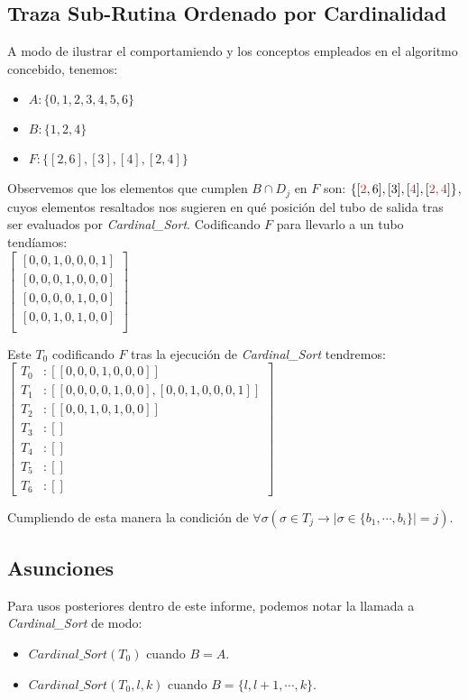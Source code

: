 \documentclass[12pt, letterpaper, twoside]{article}
\begin{document}
    \subsection{Traza Sub-Rutina Ordenado por Cardinalidad}
    \par A modo de ilustrar el comportamiendo y los conceptos empleados en el algoritmo concebido, tenemos:
    \begin{itemize}
        \item $A: \{0, 1, 2, 3, 4, 5, 6\}$
        \item $B: \{1, 2, 4\}$
        \item $F: \{[2, 6], [3], [4], [2, 4]\}$
    \end{itemize}
    \par Observemos que los elementos que cumplen $B\cap D_j$ en $F$ son: $\{[\textcolor{red}{2}, 6], [3], [\textcolor{red}{4}], [\textcolor{red}{2, 4}]\}$, cuyos elementos resaltados nos sugieren en qué posición del tubo de salida tras ser evaluados por \emph{Cardinal\_Sort}. Codificando $F$ para llevarlo a un tubo tendíamos: \\
    $
        \begin{bmatrix}
            [0, 0, 1, 0, 0, 0, 1] \\
            [0, 0, 0, 1, 0, 0, 0] \\
            [0, 0, 0, 0, 1, 0, 0] \\
            [0, 0, 1, 0, 1, 0, 0] \\
        \end{bmatrix}
    $
    \par Este $T_0$ codificando $F$ tras la ejecución de \emph{Cardinal\_Sort} tendremos: \\
    $
    \begin{bmatrix}
            T_0&: [[0, 0, 0, 1, 0, 0, 0]] \\
            T_1&: [[0, 0, 0, 0, 1, 0, 0], [0, 0, 1, 0, 0, 0, 1]] \\
            T_2&: [[0, 0, 1, 0, 1, 0, 0]] \\
            T_3&: [] \\
            T_4&: [] \\
            T_5&: [] \\
            T_6&: [] 
    \end{bmatrix}
    $
    \par Cumpliendo de esta manera la condición de $\forall\sigma(\sigma\in T_j \rightarrow|\sigma\in\{b_1,\cdots,b_i\}|=j)$.

    \subsection{Asunciones}
    \par Para usos posteriores dentro de este informe, podemos notar la llamada a \emph{Cardinal\_Sort} de modo:
    \begin{itemize}
        \item $Cardinal\_Sort(T_0)$ cuando $B=A$.
        \item $Cardinal\_Sort(T_0, l, k)$ cuando $B=\{l, l+1,\cdots,k\}$.
    \end{itemize}
\end{document}
